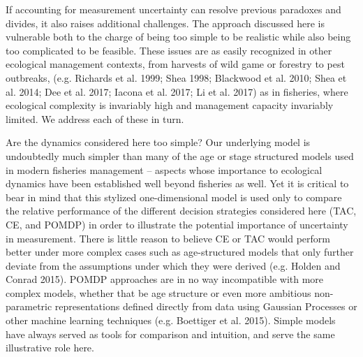\documentclass[3p]{elsarticle} %
\begin{document}
If accounting for measurement uncertainty can resolve previous paradoxes
and divides, it also raises additional challenges. The approach
discussed here is vulnerable both to the charge of being too simple to
be realistic while also being too complicated to be feasible. These
issues are as easily recognized in other ecological management contexts,
from harvests of wild game or forestry to pest outbreaks, (e.g. Richards
et al. 1999; Shea 1998; Blackwood et al. 2010; Shea et al. 2014; Dee et
al. 2017; Iacona et al. 2017; Li et al. 2017) as in fisheries, where
ecological complexity is invariably high and management capacity
invariably limited. We address each of these in turn.

Are the dynamics considered here too simple? Our underlying model is
undoubtedly much simpler than many of the age or stage structured models
used in modern fisheries management -- aspects whose importance to
ecological dynamics have been established well beyond fisheries as well.
Yet it is critical to bear in mind that this stylized one-dimensional
model is used only to compare the relative performance of the different
decision strategies considered here (TAC, CE, and POMDP) in order to
illustrate the potential importance of uncertainty in measurement. There
is little reason to believe CE or TAC would perform better under more
complex cases such as age-structured models that only further deviate
from the assumptions under which they were derived (e.g. Holden and
Conrad 2015). POMDP approaches are in no way incompatible with more
complex models, whether that be age structure or even more ambitious
non-parametric representations defined directly from data using Gaussian
Processes or other machine learning techniques (e.g. Boettiger et al.
2015). Simple models have always served as tools for comparison and
intuition, and serve the same illustrative role here.
\end{document}
